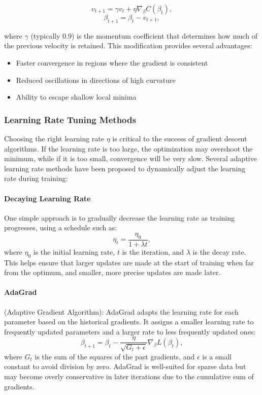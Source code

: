 \documentclass[aps,pra,english,notitlepage,reprint,nofootinbib]{revtex4-1}  %
\begin{document}
\begin{equation}
    v_{t+1} = \gamma v_t + \eta \nabla_\beta C(\beta_t),
\end{equation}
\begin{equation}
    \beta_{t+1} = \beta_t - v_{t+1},
\end{equation}

where \( \gamma \) (typically 0.9) is the momentum coefficient that determines how much of the previous velocity is retained. This modification provides several advantages:
\begin{itemize}
    \item Faster convergence in regions where the gradient is consistent
    \item Reduced oscillations in directions of high curvature
    \item Ability to escape shallow local minima
\end{itemize}

\subsubsection{Learning Rate Tuning Methods} \label{sec:learning_rate_tuning}

Choosing the right learning rate \( \eta \) is critical to the success of gradient descent algorithms. If the learning rate is too large, the optimization may overshoot the minimum, while if it is too small, convergence will be very slow. Several adaptive learning rate methods have been proposed to dynamically adjust the learning rate during training:

\paragraph*{Decaying Learning Rate}

One simple approach is to gradually decrease the learning rate as training progresses, using a schedule such as:
\[
    \eta_t = \frac{\eta_0}{1 + \lambda t},
\]
where \( \eta_0 \) is the initial learning rate, \( t \) is the iteration, and \( \lambda \) is the decay rate. This helps ensure that larger updates are made at the start of training when far from the optimum, and smaller, more precise updates are made later.

\paragraph*{AdaGrad}
(Adaptive Gradient Algorithm): AdaGrad adapts the learning rate for each parameter based on the historical gradients. It assigns a smaller learning rate to frequently updated parameters and a larger rate to less frequently updated ones:
\[
    \beta_{t+1} = \beta_t - \frac{\eta}{\sqrt{G_t + \epsilon}} \nabla_\beta L(\beta_t),
\]
where \( G_t \) is the sum of the squares of the past gradients, and \( \epsilon \) is a small constant to avoid division by zero. AdaGrad is well-suited for sparse data but may become overly conservative in later iterations due to the cumulative sum of gradients.
\end{document}
